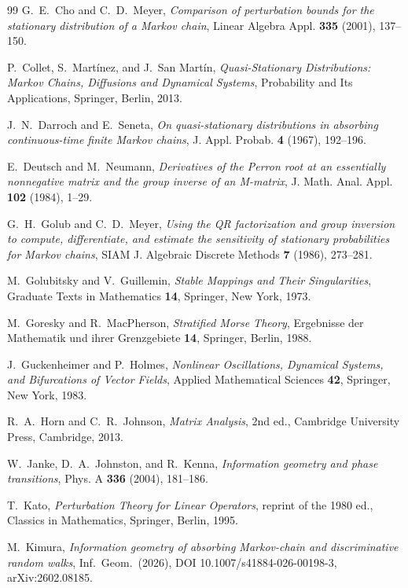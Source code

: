 \documentclass[11pt,reqno]{amsart}
\theoremstyle{plain}
\theoremstyle{definition}
\theoremstyle{remark}
\begin{document}
\begin{thebibliography}{99}
 G.~E.~Cho and C.~D.~Meyer, \emph{Comparison of perturbation
bounds for the stationary distribution of a Markov chain}, Linear Algebra Appl.
\textbf{335} (2001), 137--150.

 P.~Collet, S.~Mart\'inez, and J.~San
Mart\'in, \emph{Quasi-Stationary Distributions: Markov Chains, Diffusions and
Dynamical Systems}, Probability and Its Applications, Springer, Berlin, 2013.

 J.~N.~Darroch and E.~Seneta, \emph{On
quasi-stationary distributions in absorbing continuous-time finite Markov chains},
J. Appl. Probab. \textbf{4} (1967), 192--196.

 E.~Deutsch and M.~Neumann, \emph{Derivatives of the
Perron root at an essentially nonnegative matrix and the group inverse of an
M-matrix}, J. Math. Anal. Appl. \textbf{102} (1984), 1--29.

 G.~H.~Golub and C.~D.~Meyer, \emph{Using the QR
factorization and group inversion to compute, differentiate, and estimate the
sensitivity of stationary probabilities for Markov chains}, SIAM J. Algebraic
Discrete Methods \textbf{7} (1986), 273--281.

 M.~Golubitsky and V.~Guillemin, \emph{Stable
Mappings and Their Singularities}, Graduate Texts in Mathematics \textbf{14},
Springer, New York, 1973.

 M.~Goresky and R.~MacPherson, \emph{Stratified
Morse Theory}, Ergebnisse der Mathematik und ihrer Grenzgebiete \textbf{14},
Springer, Berlin, 1988.

 J.~Guckenheimer and P.~Holmes, \emph{Nonlinear
Oscillations, Dynamical Systems, and Bifurcations of Vector Fields}, Applied
Mathematical Sciences \textbf{42}, Springer, New York, 1983.

 R.~A.~Horn and C.~R.~Johnson, \emph{Matrix Analysis},
2nd ed., Cambridge University Press, Cambridge, 2013.

 W.~Janke, D.~A.~Johnston, and R.~Kenna,
\emph{Information geometry and phase transitions}, Phys. A \textbf{336} (2004),
181--186.

 T.~Kato, \emph{Perturbation Theory for Linear Operators},
reprint of the 1980 ed., Classics in Mathematics, Springer, Berlin, 1995.

 M.~Kimura, \emph{Information geometry of absorbing
Markov-chain and discriminative random walks}, Inf.\ Geom.\ (2026),
DOI 10.1007/s41884-026-00198-3, arXiv:2602.08185.


\end{thebibliography}
\end{document}
